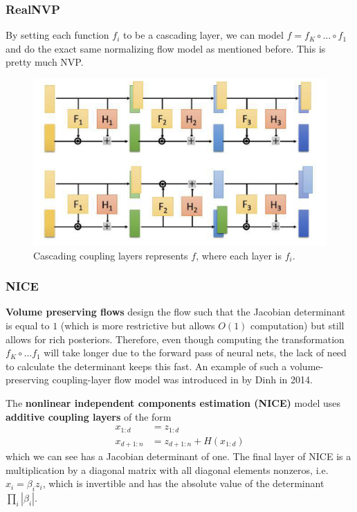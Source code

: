   \subsubsection{RealNVP}

    By setting each function $f_i$ to be a cascading layer, we can model $f = f_K \circ \ldots \circ f_1$ and do the exact same normalizing flow model as mentioned before. This is pretty much NVP. 

    \begin{figure}[H]
      \centering 
      \includegraphics[scale=0.4]{img/cascading_layers.png}
      \caption{Cascading coupling layers represents $f$, where each layer is $f_i$.} 
      \label{fig:cascading_layers}
    \end{figure}

  \subsubsection{NICE}

    \textbf{Volume preserving flows} design the flow such that the Jacobian determinant is equal to $1$ (which is more restrictive but allows $O(1)$ computation) but still allows for rich posteriors. Therefore, even though computing the transformation $f_K \circ \ldots f_1$ will take longer due to the forward pass of neural nets, the lack of need to calculate the determinant keeps this fast. An example of such a volume-preserving coupling-layer flow model was introduced in \cite{nice} by Dinh in 2014. 

    \begin{definition}[NICE]
      The \textbf{nonlinear independent components estimation (NICE)} model uses \textbf{additive coupling layers} of the form 
      \begin{align}
        x_{1:d} & = z_{1:d} \\
        x_{d+1:n} & = z_{d+1:n} + H(x_{1:d})
      \end{align}
      which we can see has a Jacobian determinant of one. The final layer of NICE is a multiplication by a diagonal matrix with all diagonal elements nonzeros, i.e. $x_i = \beta_i z_i$, which is invertible and has the absolute value of the determinant $\prod_i |\beta_i|$. 
    \end{definition}

